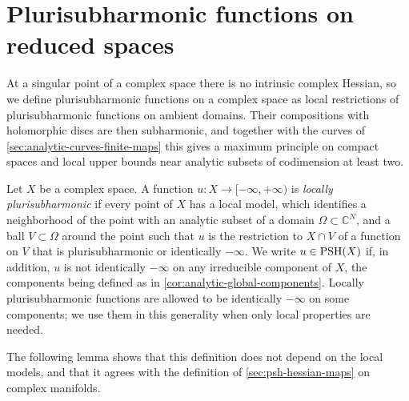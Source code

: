\section{Plurisubharmonic functions on reduced spaces}\label{sec:psh-reduced-spaces}

At a singular point of a complex space there is no intrinsic complex Hessian, so we define plurisubharmonic functions on a complex space as local restrictions of plurisubharmonic functions on ambient domains. Their compositions with holomorphic discs are then subharmonic, and together with the curves of \cref{sec:analytic-curves-finite-maps} this gives a maximum principle on compact spaces and local upper bounds near analytic subsets of codimension at least two.

\begin{definition}\label{def:psh-reduced-space}
Let $X$ be a complex space. A function $u\colon X\to[-\infty,+\infty)$ is \emph{locally plurisubharmonic} if every point of $X$ has a local model, which identifies a neighborhood of the point with an analytic subset of a domain $\Omega\subset\mathbb C^N$, and a ball $V\subset\Omega$ around the point such that $u$ is the restriction to $X\cap V$ of a function on $V$ that is plurisubharmonic or identically $-\infty$. We write $u\in\mathrm{PSH}(X)$ if, in addition, $u$ is not identically $-\infty$ on any irreducible component of $X$, the components being defined as in \cref{cor:analytic-global-components}. Locally plurisubharmonic functions are allowed to be identically $-\infty$ on some components; we use them in this generality when only local properties are needed.
\end{definition}

The following lemma shows that this definition does not depend on the local models, and that it agrees with the definition of \cref{sec:psh-hessian-maps} on complex manifolds.

